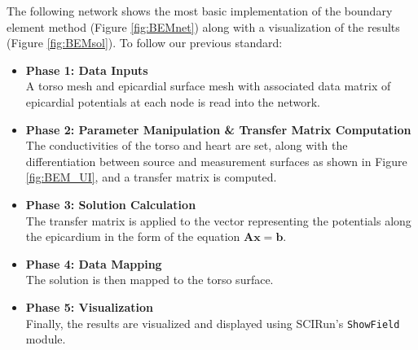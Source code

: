 The following network shows the most basic implementation of the boundary element method (Figure \ref{fig:BEMnet})
along with a visualization of the results (Figure \ref{fig:BEMsol}). To follow our previous standard:
\begin{itemize}
\item {\bf Phase 1: Data Inputs} \\
A torso mesh and epicardial surface mesh with associated data matrix of epicardial potentials at each node is read into the network.
\item {\bf Phase 2: Parameter Manipulation \& Transfer Matrix Computation} \\
The conductivities of the torso and heart are set, along with the differentiation between source and measurement surfaces as shown in Figure \ref{fig:BEM_UI}, and a transfer matrix is computed.
\item {\bf Phase 3: Solution Calculation} \\
The transfer matrix is applied to the vector representing the potentials along the epicardium in the form of the equation $\mathbf{Ax = b}$.
\item {\bf Phase 4: Data Mapping} \\
The solution is then mapped to the torso surface.
\item {\bf Phase 5: Visualization} \\
Finally, the results are visualized and displayed using SCIRun's {\tt ShowField} module.
\end{itemize}



\newpage

